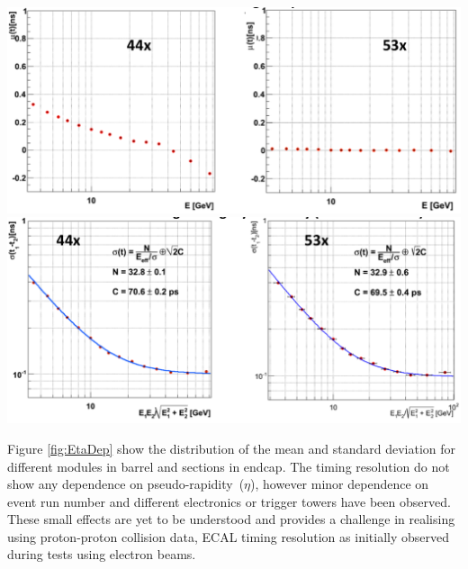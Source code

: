 \begin{center}\label{TimeBias}
\centering
\mbox{\includegraphics[scale=0.45]{THESISPLOTS/AmplitudeVsTimeCMSSW_Comparison.png}}
\vspace{4cm}
\mbox{\includegraphics[scale=0.46]{THESISPLOTS/TimingResolutionCMSSW_Comparison.png}}
\label{fig:TimeBias}
\end{center}

Figure \ref{fig:EtaDep} show the distribution of the mean and standard deviation for different modules in barrel and sections in endcap. The timing resolution do not show any dependence on pseudo-rapidity~($\eta$), however minor dependence on event run number and different electronics or trigger towers have been observed. These small effects are yet to be understood and provides a challenge in realising using proton-proton collision data, ECAL timing resolution as initially observed during tests using electron beams.

